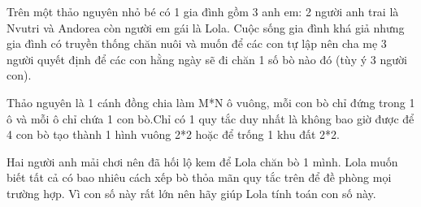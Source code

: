 Trên một thảo nguyên nhỏ bé có 1 gia đình gồm 3 anh em: 2 người anh trai là Nvutri và Andorea còn người em gái là Lola. Cuộc sống gia đình khá giả nhưng gia đình có truyền thống chăn nuôi và muốn để các con tự lập nên cha mẹ 3 người quyết định để các con hằng ngày sẽ đi chăn 1 số bò nào đó (tùy ý 3 người con).  

   Thảo nguyên là 1 cánh đồng chia làm M*N ô vuông, mỗi con bò chỉ đứng trong 1 ô và mỗi ô chỉ chứa 1 con bò.Chỉ có 1 quy tắc duy nhất là không bao giờ được để 4 con bò tạo thành 1 hình vuông 2*2 hoặc để trống 1 khu đất 2*2.  

   Hai người anh mải chơi nên đã hối lộ kem để Lola chăn bò 1 mình. Lola muốn biết tất cả có bao nhiêu cách xếp bò thỏa mãn quy tắc trên để đề phòng mọi trường hợp. Vì con số này rất lớn nên hãy giúp Lola tính toán con số này.  

\